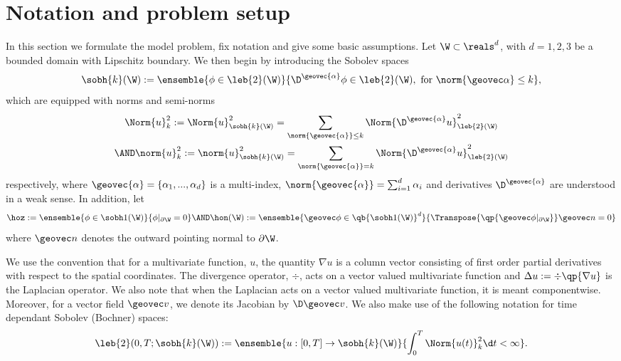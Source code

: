 \documentclass[final]{amsart}
\numberwithin{equation}{section}
\begin{document}
\section{Notation and problem setup}
\label{sec:notation}

In this section we formulate the model problem, fix notation and give
some basic assumptions. Let $\W\subset \reals^{d}$, with $d=1,2,3$ be
a bounded domain with Lipschitz boundary. We then begin by
introducing the Sobolev spaces \cite{Ciarlet:1978,Evans:1998}
\begin{equation}
  \sobh{k}(\W) 
  := 
  \ensemble{\phi\in\leb{2}(\W)}
  {\D^{{\geovec{\alpha}}}\phi\in\leb{2}(\W), \text{ for } \norm{\geovec\alpha}\leq k},
\end{equation}
which are equipped with norms and semi-norms
\begin{gather}
  \Norm{u}_{k}^2
  := 
  \Norm{u}_{\sobh{k}(\W)}^2 
  = 
  \sum_{\norm{{\geovec{\alpha}}}\leq k}\Norm{\D^{{\geovec{\alpha}}} u}_{\leb{2}(\W)}^2 
  \\
  \AND \norm{u}_{k}^2 
  :=
  \norm{u}_{\sobh{k}(\W)}^2 
  =
  \sum_{\norm{{\geovec{\alpha}}} = k}\Norm{\D^{{\geovec{\alpha}}} u}_{\leb{2}(\W)}^2
\end{gather}
respectively, where ${\geovec{\alpha}} = \{ \alpha_1,...,\alpha_d\}$ is a
multi-index, $\norm{{\geovec{\alpha}}} = \sum_{i=1}^d\alpha_i$ and
derivatives $\D^{{\geovec{\alpha}}}$ are understood in a weak sense. In addition, let
\begin{equation}
  \hoz 
  := 
  \ensemble{\phi\in\sobh1(\W)}
  {\phi\vert_{\partial\W} = 0} 
  \AND
  \hon(\W)
  := 
  \ensemble{\geovec \phi\in\qb{\sobh1(\W)}^d}
  {\Transpose{\qp{\geovec \phi \vert_{\partial\W}}}\geovec n = 0} 
\end{equation}
where $\geovec n$ denotes the outward pointing normal to $\partial
\W$.

We use the convention that for a multivariate function, $u$, the
quantity $\nabla u$ is a column vector consisting of first order
partial derivatives with respect to the spatial coordinates. The
divergence operator, $\div{}$, acts on a vector valued multivariate
function and $\Delta u := \div\qp{\nabla u}$ is the Laplacian
operator. We also note that when the Laplacian acts on a vector valued
multivariate function, it is meant componentwise.  Moreover, for a
vector field $\geovec v$, we denote its Jacobian by $\D \geovec v$. We
also make use of the following notation for time dependant Sobolev
(Bochner) spaces:
\begin{equation}
  \leb{2}(0,T; \sobh{k}(\W))
  :=
  \ensemble{u : [0,T] \to \sobh{k}(\W)}
           {\int_0^T \Norm{u(t)}_{k}^2 \d t < \infty}.
\end{equation}
\end{document}
